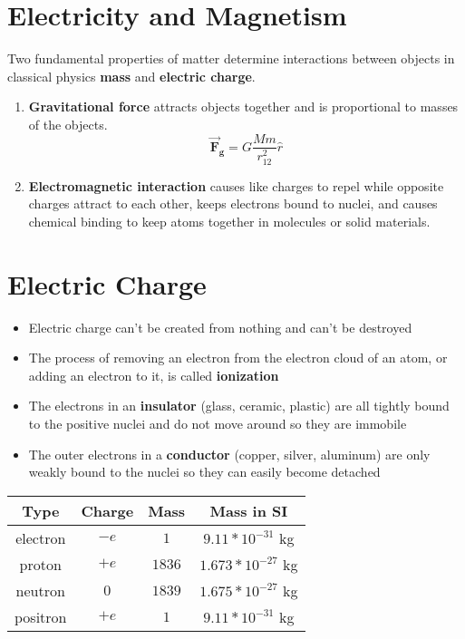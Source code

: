 \documentclass{article}
\begin{document}
\section*{Electricity and Magnetism}

Two fundamental properties of matter determine interactions between objects in classical physics
\textbf{mass} and \textbf{electric charge}.
\begin{enumerate}
    \item \textbf{Gravitational force} attracts objects together and is proportional to masses of
    the objects.
    \[\mathbf{\vec{F}_g} = G \frac{Mm}{r_{12}^2} \hat{r}\]
    \item \textbf{Electromagnetic interaction} causes like charges to repel while opposite charges
    attract to each other, keeps electrons bound to nuclei, and causes chemical binding to keep
    atoms together in molecules or solid materials.
    
\end{enumerate}
\section*{Electric Charge}

\begin{itemize}
    \item Electric charge can't be created from nothing and can't be destroyed
    \item The process of removing an electron from the electron cloud of an atom, or adding an
    electron to it, is called \textbf{ionization}
    \item The electrons in an \textbf{insulator} (glass, ceramic, plastic) are all tightly bound to
    the positive nuclei and do not move around so they are immobile
    \item The outer electrons in a \textbf{conductor} (copper, silver, aluminum) are only weakly
    bound to the nuclei so they can easily become detached
\end{itemize}
\begin{center}
\begin{tabular}{|c c c c|} 
    \hline
    Type & Charge & Mass & Mass in SI \\ [0.5ex] 
    \hline
    electron & $-e$ & $1$ & $9.11 * 10^{-31}$ kg \\ 
    \hline
    proton & $+e$ & $1836$ & $1.673 * 10^{-27}$ kg \\
    \hline
    neutron & $0$ & $1839$ & $1.675 * 10^{-27}$ kg \\
    \hline
    positron & $+e$ & $1$ & $9.11 * 10^{-31}$ kg \\
    \hline
\end{tabular}
\end{center}
\end{document}
